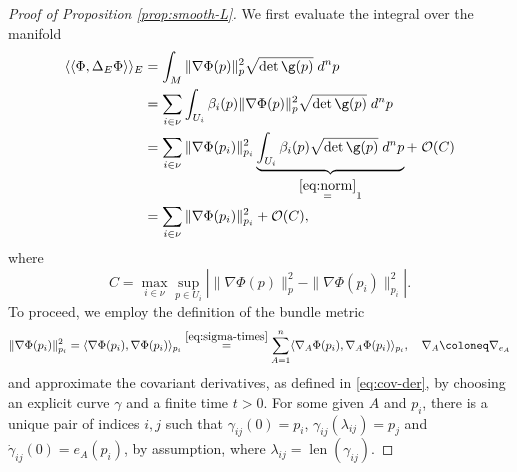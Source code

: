 \documentclass[10pt,reqno]{amsart}
\numberwithin{equation}{section}
\theoremstyle{bfnote}
\theoremstyle{bfdef}
\newcommand{\mc}[1]{\mathcal{#1}}
\newcommand{\la}{\langle}
\newcommand{\ra}{\rangle}
\newcommand{\lla}{\langle\langle}
\newcommand{\rra}{\rangle\rangle}
\newcommand{\n}[1]{\|#1\|}
\renewcommand\o\operatorname
\begin{document}
	\begin{proof}[Proof of Proposition \ref{prop:smooth-L}]
		We first evaluate the integral over the manifold
		\begin{equation}\label{eq:proof-bundle-metric-aux}
			\begin{aligned}
				\lla \Phi, \Delta_{E} \Phi \rra_{E}
				&=
				\int_M \n{\nabla \Phi(p)}_p^2 \sqrt{\det \g(p)} \; d^{n}p
				\\
				&=
				\sum_{i \in \nu} \int_{U_i} \beta_i(p) \n{\nabla \Phi(p)}_p^2 \sqrt{\det \g(p)} \; d^{n}p
				\\
				&=
				\sum_{i \in \nu} \n{\nabla \Phi(p_i)}_{p_{i}}^2 \underbrace{\int_{U_i} \beta_i(p) \sqrt{\det \g(p)} \; d^{n} p}_{\overset{\eqref{eq:norm}}{=}1} +  \; \mc{O}(C) \\
				&=
				\sum_{i \in \nu} \n{\nabla \Phi(p_i)}_{p_{i}}^2 +  \mc{O}(C),
			\end{aligned}
		\end{equation}
		where
		\begin{equation}
			C = \max_{i \in \nu} \sup_{p \in U_i} \left| \n{\nabla \Phi(p)}_{p}^2 - \n{\nabla \Phi(p_i)}_{p_{i}}^2 \right|.
		\end{equation}
		To proceed, we employ the definition of the bundle metric
		\begin{equation}\label{eq:proof-nabla-Phi-pi-aux}
			\n{\nabla \Phi(p_i)}_{p_{i}}^2
			=
			\la \nabla \Phi(p_i), \nabla \Phi(p_i) \ra_{p_{i}}
			\overset{\eqref{eq:sigma-times}}{=}
			\sum_{A=1}^{n} \la \nabla_A \Phi(p_i) , \nabla_A \Phi(p_i) \ra_{p_{i}},
			\quad \nabla_{A} \coloneq \nabla_{e_{A}}
		\end{equation}
		and approximate the covariant derivatives, as defined in \eqref{eq:cov-der}, by choosing an explicit curve $\gamma$ and a finite time $t > 0$. For some given $A$ and $p_{i}$, there is a unique pair of indices $i,j$ such that $\gamma_{ij}(0) = p_{i}$, $\gamma_{ij}(\lambda_{ij}) = p_{j}$ and $\dot{\gamma}_{ij}(0) = e_{A}(p_{i})$, by assumption, where $\lambda_{ij} = \o{len}(\gamma_{ij})$.  
		

\end{proof}
\end{document}

